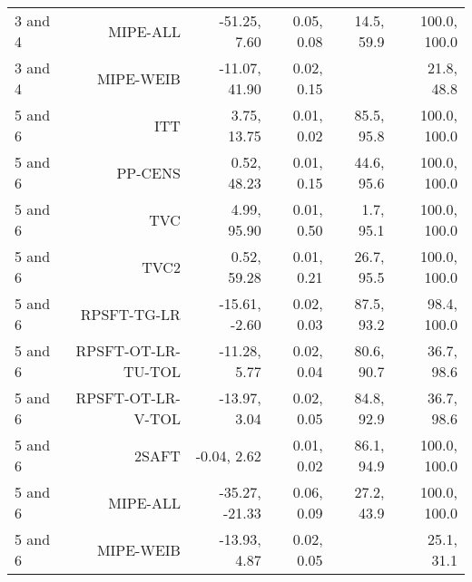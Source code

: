 {\begin{tabular}{lrrrrr}
  3 and 4 & MIPE-ALL & -51.25,  7.60 & 0.05, 0.08 & 14.5, 59.9 & 100.0, 100.0 \\ 
  3 and 4 & MIPE-WEIB & -11.07, 41.90 & 0.02, 0.15 &  & 21.8, 48.8 \\ 
   \hline
5 and 6 & ITT &   3.75,  13.75 & 0.01, 0.02 & 85.5, 95.8 & 100.0, 100.0 \\ 
  5 and 6 & PP-CENS &   0.52,  48.23 & 0.01, 0.15 & 44.6, 95.6 & 100.0, 100.0 \\ 
  5 and 6 & TVC &   4.99,  95.90 & 0.01, 0.50 &  1.7, 95.1 & 100.0, 100.0 \\ 
  5 and 6 & TVC2 &   0.52,  59.28 & 0.01, 0.21 & 26.7, 95.5 & 100.0, 100.0 \\ 
  5 and 6 & RPSFT-TG-LR & -15.61,  -2.60 & 0.02, 0.03 & 87.5, 93.2 & 98.4, 100.0 \\ 
  5 and 6 & RPSFT-OT-LR-TU-TOL & -11.28,   5.77 & 0.02, 0.04 & 80.6, 90.7 & 36.7, 98.6 \\ 
  5 and 6 & RPSFT-OT-LR-V-TOL & -13.97,   3.04 & 0.02, 0.05 & 84.8, 92.9 & 36.7, 98.6 \\ 
  5 and 6 & 2SAFT &  -0.04,   2.62 & 0.01, 0.02 & 86.1, 94.9 & 100.0, 100.0 \\ 
  5 and 6 & MIPE-ALL & -35.27, -21.33 & 0.06, 0.09 & 27.2, 43.9 & 100.0, 100.0 \\ 
  5 and 6 & MIPE-WEIB & -13.93,   4.87 & 0.02, 0.05 &  & 25.1, 31.1 \\ 
   \hline
\end{tabular}
}
